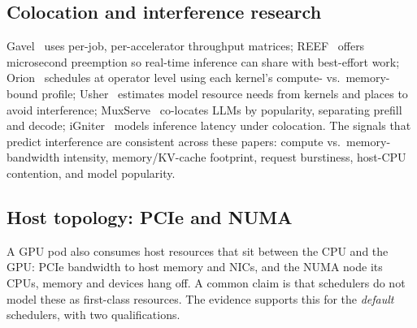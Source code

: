 \subsection{Colocation and interference research}
Gavel~\cite{narayanan2020gavel} uses per-job, per-accelerator throughput matrices; REEF~\cite{han2022reef} offers microsecond preemption so real-time inference can share with best-effort work; Orion~\cite{strati2024orion} schedules at operator level using each kernel's compute- vs.\ memory-bound profile; Usher~\cite{shubha2024usher} estimates model resource needs from kernels and places to avoid interference; MuxServe~\cite{duan2024muxserve} co-locates LLMs by popularity, separating prefill and decode; iGniter~\cite{xu2022igniter} models inference latency under colocation. The signals that predict interference are consistent across these papers: compute vs.\ memory-bandwidth intensity, memory/KV-cache footprint, request burstiness, host-CPU contention, and model popularity.

\subsection{Host topology: PCIe and NUMA}
\label{sec:hosttopo}
A GPU pod also consumes host resources that sit between the CPU and the GPU: PCIe bandwidth to host memory and NICs, and the NUMA node its CPUs, memory and devices hang off. A common claim is that schedulers do not model these as first-class resources. The evidence supports this for the \emph{default} schedulers, with two qualifications.

